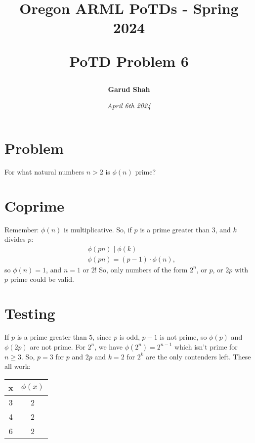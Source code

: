 \documentclass{article}
\title{\begin{center}
    Oregon ARML PoTDs - Spring 2024
\end{center}
\begin{center}
    \textbf{PoTD Problem 6}
\end{center}}
\author{\textbf{Garud Shah}}
\date{\textit{April 6th 2024}}
\begin{document}
\maketitle
\newpage
\tableofcontents
\newpage
\section{Problem}
For what natural numbers $n > 2$ is $\phi (n)$ prime?
\section{Coprime}
Remember: $\phi(n)$ is multiplicative. So, if $p$ is a prime greater than 3, and $k$ divides $p$:
\begin{align}
    & \phi(pn) \mid \phi(k)  \\
    & \phi(pn) = (p - 1) \cdot \phi(n),
\end{align}
so $\phi(n) = 1$, and $n = 1$ or $2$! So, only numbers of the form $2^n$, or $p$, or $2p$ with $p$ prime could be valid. 
\newpage
\section{Testing}
If $p$ is a prime greater than $5$,
since $p$ is odd, $p-1$ is not prime, so $\phi(p)$ and $\phi(2p)$ are not prime. For $2^n$, we have $\phi(2^n) = 2^{n-1}$ which isn't prime
for $n \ge 3$. So, $p = 3$ for $p$ and $2p$ and $k = 2$ for $2^k$ are the only contenders left. \newline
These all work:
\begin{center}
\begin{tabular}{|c|c|}
    \hline
    x & $\phi(x)$ \\
    \hline
    3 & 2 \\
    4 & 2 \\
    6 & 2 \\
    \hline
\end{tabular}
\end{center}
\end{document}
